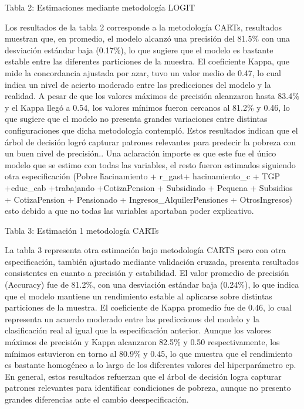 \documentclass[12pt,a4paper,onecolumn]{article}
\begin{document}
{\color{blue} Tabla 2: Estimaciones mediante metodología LOGIT}

Los resultados de la tabla 2 corresponde a la metodología CARTs, resultados muestran que, en promedio, el modelo alcanzó una precisión del 81.5\% con una desviación estándar baja (0.17\%), lo que sugiere que el modelo es bastante estable entre las diferentes particiones de la muestra. El coeficiente Kappa, que mide la concordancia ajustada por azar, tuvo un valor medio de 0.47, lo cual indica un nivel de acierto moderado entre las predicciones del modelo y la realidad. A pesar de que los valores máximos de precisión alcanzaron hasta 83.4\% y el Kappa llegó a 0.54, los valores mínimos fueron cercanos al 81.2\% y 0.46, lo que sugiere que el modelo no presenta grandes variaciones entre distintas configuraciones que dicha metodología contempló. Estos resultados indican que el árbol de decisión logró capturar patrones relevantes para predecir la pobreza con un buen nivel de precisión.. Una aclaración importe es que este fue el único modelo que se estimo con todas las variables, el resto fueron estimados siguiendo otra especificación (Pobre \~ hacinamiento + r\_gast+ hacinamiento\_c + TGP +educ\_cab +trabajando +CotizaPension + Subsidiado + Pequena + Subsidios + CotizaPension + Pensionado + Ingresos\_AlquilerPensiones + OtrosIngresos) esto debido a que no todas las variables aportaban poder explicativo.

{\color{blue} Tabla 3: Estimación 1 metodología CARTs}

La tabla 3 representa otra estimación bajo metodología CARTS pero con otra especificación, también ajustado mediante validación cruzada, presenta resultados consistentes en cuanto a precisión y estabilidad. El valor promedio de precisión (Accuracy) fue de 81.2\%, con una desviación estándar baja (0.24\%), lo que indica que el modelo mantiene un rendimiento estable al aplicarse sobre distintas particiones de la muestra. El coeficiente de Kappa promedio fue de 0.46, lo cual representa un acuerdo moderado entre las predicciones del modelo y la clasificación real al igual que la especificación anterior. Aunque los valores máximos de precisión y Kappa alcanzaron 82.5\% y 0.50 respectivamente, los mínimos estuvieron en torno al 80.9\% y 0.45, lo que muestra que el rendimiento es bastante homogéneo a lo largo de los diferentes valores del hiperparámetro cp. En general, estos resultados refuerzan que el árbol de decisión logra capturar patrones relevantes para identificar condiciones de pobreza, aunque no presento grandes diferencias ante el cambio deespecificación.
\end{document}
